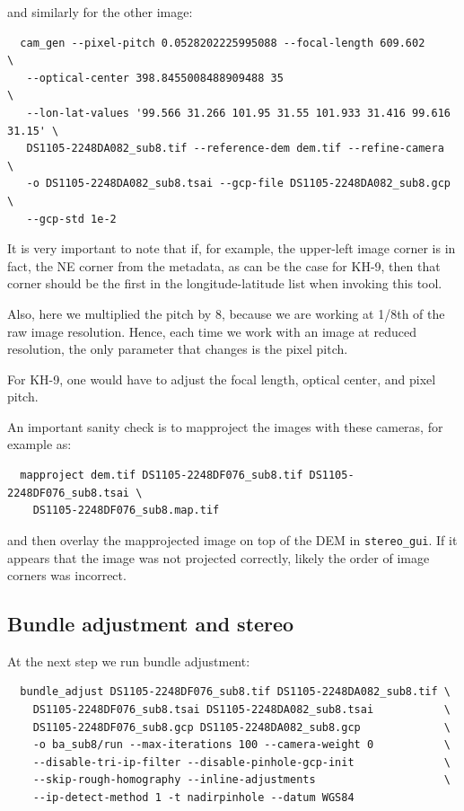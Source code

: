 and similarly for the other image:

\begin{verbatim}
  cam_gen --pixel-pitch 0.0528202225995088 --focal-length 609.602            \
   --optical-center 398.8455008488909488 35                                  \
   --lon-lat-values '99.566 31.266 101.95 31.55 101.933 31.416 99.616 31.15' \
   DS1105-2248DA082_sub8.tif --reference-dem dem.tif --refine-camera         \
   -o DS1105-2248DA082_sub8.tsai --gcp-file DS1105-2248DA082_sub8.gcp        \
   --gcp-std 1e-2               
\end{verbatim}

It is very important to note that if, for example, the upper-left image
corner is in fact, the NE corner from the metadata, as can be the case
for KH-9, then that corner should be the first in the longitude-latitude
list when invoking this tool.

Also, here we multiplied the pitch by 8, because we are working at 1/8th
of the raw image resolution. Hence, each time we work with an image at
reduced resolution, the only parameter that changes is the pixel pitch.

For KH-9, one would have to adjust the focal length, optical center, and
pixel pitch.

An important sanity check is to mapproject the images with these
cameras, for example as:

\begin{verbatim}
  mapproject dem.tif DS1105-2248DF076_sub8.tif DS1105-2248DF076_sub8.tsai \
    DS1105-2248DF076_sub8.map.tif
\end{verbatim}

and then overlay the mapprojected image on top of the DEM in \texttt{stereo\_gui}.
If it appears that the image was not projected correctly, likely 
the order of image corners was incorrect. 

\subsection{Bundle adjustment and stereo}

At the next step we run bundle adjustment:

\begin{verbatim}
  bundle_adjust DS1105-2248DF076_sub8.tif DS1105-2248DA082_sub8.tif \
    DS1105-2248DF076_sub8.tsai DS1105-2248DA082_sub8.tsai           \
    DS1105-2248DF076_sub8.gcp DS1105-2248DA082_sub8.gcp             \
    -o ba_sub8/run --max-iterations 100 --camera-weight 0           \
    --disable-tri-ip-filter --disable-pinhole-gcp-init              \
    --skip-rough-homography --inline-adjustments                    \
    --ip-detect-method 1 -t nadirpinhole --datum WGS84
\end{verbatim}

